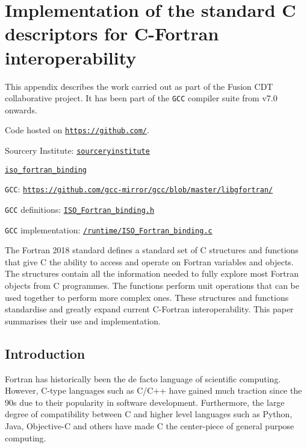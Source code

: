 \chapter{Implementation of the standard C descriptors for C-Fortran interoperability}\label{c:isocbinding}

This appendix describes the work carried out as part of the Fusion CDT collaborative project. It has been part of the \texttt{GCC} compiler suite from v7.0 onwards.

Code hosted on \href{https://github.com}{\texttt{https://github.com/}}.

\noindent Sourcery Institute: \href{https://github.com/sourceryinstitute/}{\texttt{sourceryinstitute}}

\noindent\href{https://github.com/sourceryinstitute/iso_Fortran_binding/}{\texttt{iso\_fortran\_binding}}

\noindent\texttt{GCC}: \href{https://github.com/gcc-mirror/gcc/blob/master/libgfortran/}{\texttt{https://github.com/gcc-mirror/gcc/blob/master/libgfortran/}}

\noindent \texttt{GCC} definitions: \href{https://github.com/gcc-mirror/gcc/blob/master/libgfortran/ISO_Fortran_binding.h}{\texttt{ISO\_Fortran\_binding.h}}

\noindent\texttt{GCC} implementation: \href{https://github.com/gcc-mirror/gcc/blob/master/libgfortran/runtime/ISO_Fortran_binding.c}{\texttt{/runtime/ISO\_Fortran\_binding.c}}

The Fortran 2018 standard \cite{fortran} defines a standard set of C structures and functions that give C the ability to access and operate on Fortran variables and objects. The structures contain all the information needed to fully explore most Fortran objects from C programmes. The functions perform unit operations that can be used together to perform more complex ones. These structures and functions standardise and greatly expand current C-Fortran interoperability. This paper summarises their use and implementation.

\section{Introduction}

Fortran has historically been the de facto language of scientific computing. However, C-type languages such as C/C++ have gained much traction since the 90s due to their popularity in software development. Furthermore, the large degree of compatibility between C and higher level languages such as Python, Java, Objective-C and others have made C the center-piece of general purpose computing.

